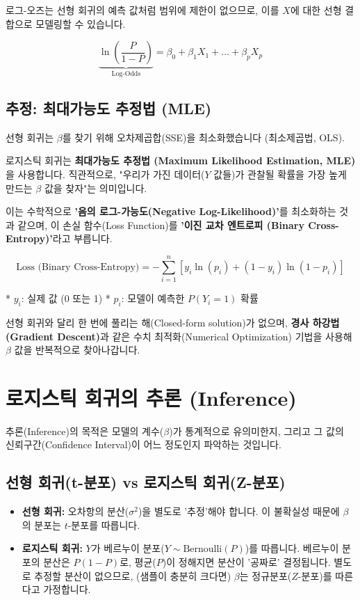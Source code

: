 \documentclass[11pt,a4paper]{book}
\theoremstyle{definition}
\begin{document}
로그-오즈는 선형 회귀의 예측 값처럼 범위에 제한이 없으므로,
이를 $X$에 대한 선형 결합으로 모델링할 수 있습니다.

$$ \underbrace{\ln\left(\frac{P}{1-P}\right)}_{\text{Log-Odds}} = \beta_0 + \beta_1 X_1 + \dots + \beta_p X_p $$

\subsection{추정: 최대가능도 추정법 (MLE)}

선형 회귀는 $\beta$를 찾기 위해 오차제곱합(SSE)을 최소화했습니다 (최소제곱법, OLS).

로지스틱 회귀는 \textbf{최대가능도 추정법 (Maximum Likelihood Estimation, MLE)}을 사용합니다.
직관적으로, "우리가 가진 데이터($Y$ 값들)가 관찰될 확률을 가장 높게 만드는 $\beta$ 값을 찾자"는 의미입니다.

이는 수학적으로 \textbf{'음의 로그-가능도(Negative Log-Likelihood)'}를 최소화하는 것과 같으며,
이 손실 함수(Loss Function)를 \textbf{'이진 교차 엔트로피 (Binary Cross-Entropy)'}라고 부릅니다.

$$ \text{Loss (Binary Cross-Entropy)} = - \sum_{i=1}^{n} \left[ y_i \ln(p_i) + (1-y_i) \ln(1-p_i) \right] $$

* $y_i$: 실제 값 (0 또는 1)
* $p_i$: 모델이 예측한 $P(Y_i=1)$ 확률

선형 회귀와 달리 한 번에 풀리는 해(Closed-form solution)가 없으며,
\textbf{경사 하강법(Gradient Descent)}과 같은 수치 최적화(Numerical Optimization) 기법을 사용해 $\beta$ 값을 반복적으로 찾아나갑니다.


\section{로지스틱 회귀의 추론 (Inference)}

추론(Inference)의 목적은 모델의 계수($\beta$)가 통계적으로 유의미한지,
그리고 그 값의 신뢰구간(Confidence Interval)이 어느 정도인지 파악하는 것입니다.

\subsection{선형 회귀(t-분포) vs 로지스틱 회귀(Z-분포)}

\begin{itemize}
  \item \textbf{선형 회귀:} 오차항의 분산($\sigma^2$)을 별도로 '추정'해야 합니다. 이 불확실성 때문에 $\beta$의 분포는 $t$-분포를 따릅니다.
  \item \textbf{로지스틱 회귀:} $Y$가 베르누이 분포($Y \sim \text{Bernoulli}(P)$)를 따릅니다.
  베르누이 분포의 분산은 $P(1-P)$로, 평균($P$)이 정해지면 분산이 '공짜로' 결정됩니다.
  별도로 추정할 분산이 없으므로, (샘플이 충분히 크다면) $\beta$는 정규분포($Z$-분포)를 따른다고 가정합니다.
\end{itemize}
\end{document}
